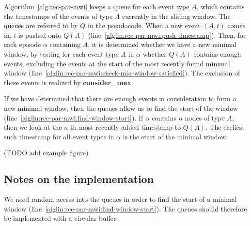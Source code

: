 Algorithm~\ref{alg:rec-par-mwi} keeps a queue for each event type $ A $, which contains the timestamps of the events of type $ A $ currently in the sliding window. The queues are referred to by $ Q $ in the pseudocode. When a new event $ (A, t) $ comes in, $ t $ is pushed onto $ Q(A) $ (line~\ref{alglin:rec-par-mwi:push-timestamp}). Then, for each episode $ \alpha $ containing $ A $, it is determined whether we have a new minimal window, by testing for each event type $ A $ in $ \alpha $ whether $ Q(A) $ contains enough events, excluding the events at the start of the most recently found minimal window (line~\ref{alglin:rec-par-mwi:check-min-window-satisfied}). The exclusion of these events is realized by \textbf{consider\_max}.

If we have determined that there are enough events in consideration to form a new minimal window, then the queues allow us to find the start of the window (line~\ref{alglin:rec-par-mwi:find-window-start}). If $ \alpha $ contains $ n $ nodes of type $ A $, then we look at the $ n $-th most recently added timestamp to $ Q(A) $. The earliest such timestamp for all event types in $ \alpha $ is the start of the minimal window.


(TODO add example figure)

\iffalse
\begin{figure}
\centering

\begin{tikzpicture}

\sequencetickmarks{7}{0}{0}
\sequenceeventtypes{0}{1em}{1}{1/a,2/b,3/a,4/b,5/c,6/b,7/a}

\windowthingy{(0,-5pt)}{2}
\windowthingy{(0.5,-10pt)}{2}
\windowthingy{(1,-5pt)}{2}
\windowthingy{(2.5,-5pt)}{2}

\end{tikzpicture}

\caption{All of the minimal windows of $ \{ a, b \} $ in the sequence.}
\label{fig:rec-par-mwi-example}
\end{figure}
\fi

\subsection{Notes on the implementation}

We need random access into the queues in order to find the start of a minimal window (line~\ref{alglin:rec-par-mwi:find-window-start}). The queues should therefore be implemented with a circular buffer.


